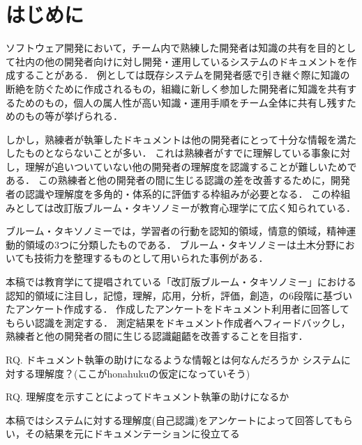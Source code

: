 \section{はじめに}
ソフトウェア開発において，チーム内で熟練した開発者は知識の共有を目的として社内の他の開発者向けに対し開発・運用しているシステムのドキュメントを作成することがある．
例としては既存システムを開発者感で引き継ぐ際に知識の断絶を防ぐために作成されるもの，組織に新しく参加した開発者に知識を共有するためのもの，個人の属人性が高い知識・運用手順をチーム全体に共有し残すためのもの等が挙げられる．

しかし，熟練者が執筆したドキュメントは他の開発者にとって十分な情報を満たしたものとならないことが多い．
これは熟練者がすでに理解している事象に対し，理解が追いついていない他の開発者の理解度を認識することが難しいためである．
この熟練者と他の開発者の間に生じる認識の差を改善するために，開発者の認識や理解度を多角的・体系的に評価する枠組みが必要となる．
この枠組みとしては改訂版ブルーム・タキソノミーが教育心理学にて広く知られている\cite{bib:nakao}．

ブルーム・タキソノミーでは，学習者の行動を認知的領域，情意的領域，精神運動的領域の3つに分類したものである．
ブルーム・タキソノミーは土木分野においても技術力を整理するものとして用いられた事例がある．\cite{bib:miyahara}

本稿では教育学にて提唱されている「改訂版ブルーム・タキソノミー」における認知的領域に注目し，記憶，理解，応用，分析，評価，創造，の6段階に基づいたアンケート作成する．
作成したアンケートをドキュメント利用者に回答してもらい認識を測定する．
測定結果をドキュメント作成者へフィードバックし，熟練者と他の開発者の間に生じる認識齟齬を改善することを目指す．

RQ. ドキュメント執筆の助けになるような情報とは何なんだろうか
システムに対する理解度？(ここがhonahukuの仮定になっていそう)

RQ. 理解度を示すことによってドキュメント執筆の助けになるか

本稿ではシステムに対する理解度(自己認識)をアンケートによって回答してもらい，その結果を元にドキュメンテーションに役立てる




